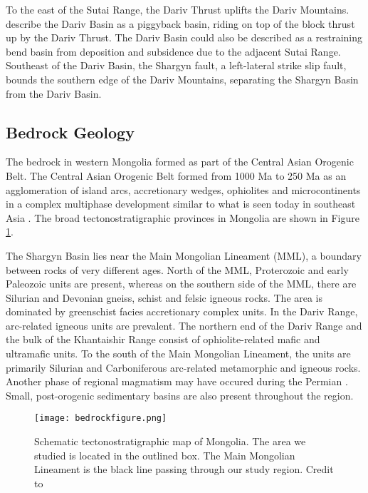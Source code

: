 	To the east of the Sutai Range, the Dariv Thrust uplifts the Dariv Mountains. \citet{Howard2006} describe the Dariv Basin as a piggyback basin, riding on top of the block thrust up by the Dariv Thrust. The Dariv Basin could also be described as a restraining bend basin from deposition and subsidence due to the adjacent Sutai Range. Southeast of the Dariv Basin, the Shargyn fault, a left-lateral strike slip fault, bounds the southern edge of the Dariv Mountains, separating the Shargyn Basin from the Dariv Basin.

\subsection{Bedrock Geology}
The bedrock in western Mongolia formed as part of the Central Asian Orogenic Belt. The Central Asian Orogenic Belt formed from 1000 Ma to 250 Ma as an agglomeration of island arcs, accretionary wedges, ophiolites and microcontinents in a complex multiphase development similar to what is seen today in southeast Asia \citep{Windley2007}. The broad tectonostratigraphic provinces in Mongolia are shown in Figure \ref{bedrock}.

The Shargyn Basin lies near the Main Mongolian Lineament (MML), a boundary between rocks of very different ages. North of the MML, Proterozoic and early Paleozoic units are present, whereas on the southern side of the MML, there are Silurian and Devonian gneiss, schist and felsic igneous rocks. The area is dominated by greenschist facies accretionary complex units. In the Dariv Range, arc-related igneous units are prevalent. The northern end of the Dariv Range and the bulk of the Khantaishir Range consist of ophiolite-related mafic and ultramafic units. To the south of the Main Mongolian Lineament, the units are primarily Silurian and Carboniferous arc-related metamorphic and igneous rocks. Another phase of regional magmatism may have occured during the Permian \citep{Windley2007}. Small, post-orogenic sedimentary basins are also present throughout the region.

\begin{figure}[h!]
  \centering
  \texttt{[image: bedrockfigure.png]}
  \caption{Schematic tectonostratigraphic map of Mongolia. The area we studied is located in the outlined box. The Main Mongolian Lineament is the black line passing through our study region. Credit to \citet{Windley2007}}
  \label{bedrock}
\end{figure}

